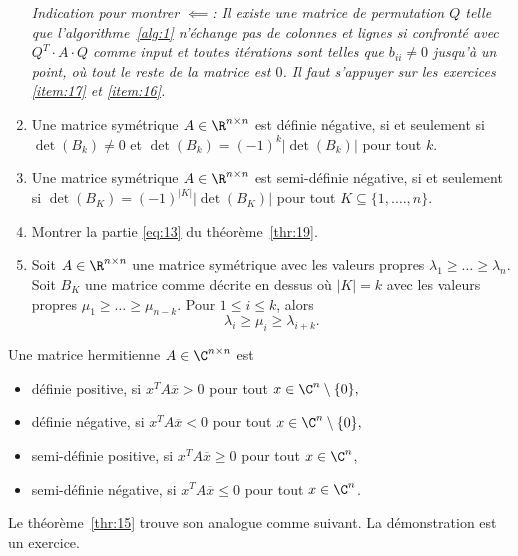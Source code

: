 \begin{enumerate}
\emph{Indication pour montrer $⟸$:  Il existe une matrice de permutation $Q$ telle que l'algorithme~\ref{alg:1} n'échange pas de colonnes et lignes si confronté avec  $Q^T \cdot A \cdot Q$ comme input et toutes itérations sont telles que $b_{ii} \neq 0$ jusqu'à  un point, où tout le reste de la matrice est $0$. Il faut s'appuyer sur les exercices \ref{item:17} et \ref{item:16}.}

\item Une matrice symétrique $A \in \R^{n \times n}$ est définie négative, si et seulement si $\det(B_k) \neq 0$ et $\det(B_k) = (-1)^k|\det(B_k)|$ pour tout $k$. 
\item Une matrice symétrique $A \in \R^{n \times n}$ est semi-définie négative, si et seulement si $\det(B_K) = (-1)^{|K|}|\det(B_K)|$ pour tout $K\subseteq \{1,.\dots,n\}$.  
\item Montrer la partie \eqref{eq:13} du théorème~\ref{thr:19}. 
\item 
Soit $A \in \R^{n \times n}$ une matrice symétrique avec les valeurs propres $\lambda_1 \geq \dots \geq \lambda_n$. 
Soit $B_K$ une matrice comme décrite en dessus o\`u $|K| = k$ avec les valeurs propres  $\mu_1 \geq \dots  \geq \mu_{n-k}$. Pour $1 \leq i \leq k$, alors 
\begin{displaymath}
  \lambda_i \geq  \mu_i \geq  \lambda_{i+k}.
\end{displaymath}
 
\end{enumerate}








\begin{definition}
  \label{def:22}
  Une matrice hermitienne $A \in \C^{n \times n}$ est 
  \begin{itemize}
  \item définie positive, si $x^TA\overline{x}>0$ pour tout $x \in \C^n \setminus  \{0\},$ 
  \item définie négative, si $x^TA\overline{x}<0$ pour tout $x \in \C^n \setminus  \{0\},$ 
  \item semi-définie positive, si $x^TA\overline{x}\geq 0$ pour tout $x \in \C^n$,
  \item semi-définie négative, si $x^TA\overline{x}\leq 0$ pour tout $x \in \C^n$.  
  \end{itemize}
\end{definition}


Le théorème~\ref{thr:15} trouve son analogue comme suivant. La démonstration est un exercice. 

